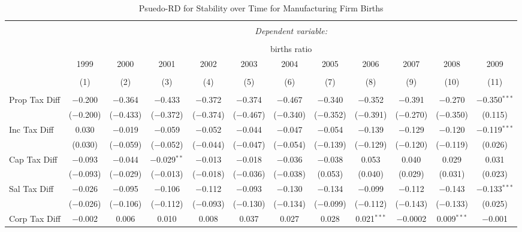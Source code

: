 
\begin{table}[!htbp] \centering 
  \caption{Psuedo-RD for Stability over Time for  Manufacturing Firm Births} 
  \label{31-33year} 
\small 
\begin{tabular}{@{\extracolsep{5pt}}lccccccccccc} 
\\[-1.8ex]\hline 
\hline \\[-1.8ex] 
 & \multicolumn{11}{c}{\textit{Dependent variable:}} \\ 
\cline{2-12} 
\\[-1.8ex] & \multicolumn{11}{c}{births ratio} \\ 
 & 1999 & 2000 & 2001 & 2002 & 2003 & 2004 & 2005 & 2006 & 2007 & 2008 & 2009 \\ 
\\[-1.8ex] & (1) & (2) & (3) & (4) & (5) & (6) & (7) & (8) & (9) & (10) & (11)\\ 
\hline \\[-1.8ex] 
 Prop Tax Diff & $-$0.200 & $-$0.364 & $-$0.433 & $-$0.372 & $-$0.374 & $-$0.467 & $-$0.340 & $-$0.352 & $-$0.391 & $-$0.270 & $-$0.350$^{***}$ \\ 
  & ($-$0.200) & ($-$0.433) & ($-$0.372) & ($-$0.374) & ($-$0.467) & ($-$0.340) & ($-$0.352) & ($-$0.391) & ($-$0.270) & ($-$0.350) & (0.115) \\ 
  Inc Tax Diff & 0.030 & $-$0.019 & $-$0.059 & $-$0.052 & $-$0.044 & $-$0.047 & $-$0.054 & $-$0.139 & $-$0.129 & $-$0.120 & $-$0.119$^{***}$ \\ 
  & (0.030) & ($-$0.059) & ($-$0.052) & ($-$0.044) & ($-$0.047) & ($-$0.054) & ($-$0.139) & ($-$0.129) & ($-$0.120) & ($-$0.119) & (0.026) \\ 
  Cap Tax Diff & $-$0.093 & $-$0.044 & $-$0.029$^{**}$ & $-$0.013 & $-$0.018 & $-$0.036 & $-$0.038 & 0.053 & 0.040 & 0.029 & 0.031 \\ 
  & ($-$0.093) & ($-$0.029) & ($-$0.013) & ($-$0.018) & ($-$0.036) & ($-$0.038) & (0.053) & (0.040) & (0.029) & (0.031) & (0.023) \\ 
  Sal Tax Diff & $-$0.026 & $-$0.095 & $-$0.106 & $-$0.112 & $-$0.093 & $-$0.130 & $-$0.134 & $-$0.099 & $-$0.112 & $-$0.143 & $-$0.133$^{***}$ \\ 
  & ($-$0.026) & ($-$0.106) & ($-$0.112) & ($-$0.093) & ($-$0.130) & ($-$0.134) & ($-$0.099) & ($-$0.112) & ($-$0.143) & ($-$0.133) & (0.025) \\ 
  Corp Tax Diff & $-$0.002 & 0.006 & 0.010 & 0.008 & 0.037 & 0.027 & 0.028 & 0.021$^{***}$ & $-$0.0002 & 0.009$^{***}$ & $-$0.001 \\ 

\end{tabular}
\end{table}
